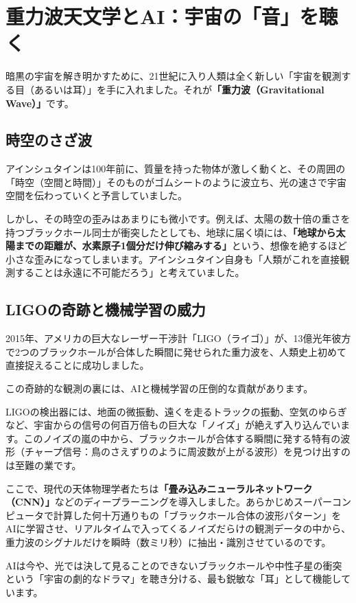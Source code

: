 \section{重力波天文学とAI：宇宙の「音」を聴く}

暗黒の宇宙を解き明かすために、21世紀に入り人類は全く新しい「宇宙を観測する目（あるいは耳）」を手に入れました。それが\textbf{「重力波（Gravitational Wave）」}です。

\subsection{時空のさざ波}

アインシュタインは100年前に、質量を持った物体が激しく動くと、その周囲の「時空（空間と時間）」そのものがゴムシートのように波立ち、光の速さで宇宙空間を伝わっていくと予言していました。

しかし、その時空の歪みはあまりにも微小です。例えば、太陽の数十倍の重さを持つブラックホール同士が衝突したとしても、地球に届く頃には、\textbf{「地球から太陽までの距離が、水素原子1個分だけ伸び縮みする」}という、想像を絶するほど小さな歪みになってしまいます。アインシュタイン自身も「人類がこれを直接観測することは永遠に不可能だろう」と考えていました。

\subsection{LIGOの奇跡と機械学習の威力}

2015年、アメリカの巨大なレーザー干渉計「LIGO（ライゴ）」が、13億光年彼方で2つのブラックホールが合体した瞬間に発せられた重力波を、人類史上初めて直接捉えることに成功しました。

この奇跡的な観測の裏には、AIと機械学習の圧倒的な貢献があります。

LIGOの検出器には、地面の微振動、遠くを走るトラックの振動、空気のゆらぎなど、宇宙からの信号の何百万倍もの巨大な「ノイズ」が絶えず入り込んでいます。このノイズの嵐の中から、ブラックホールが合体する瞬間に発する特有の波形（チャープ信号：鳥のさえずりのように周波数が上がる波形）を見つけ出すのは至難の業です。

ここで、現代の天体物理学者たちは\textbf{「畳み込みニューラルネットワーク（CNN）」}などのディープラーニングを導入しました。あらかじめスーパーコンピュータで計算した何十万通りもの「ブラックホール合体の波形パターン」をAIに学習させ、リアルタイムで入ってくるノイズだらけの観測データの中から、重力波のシグナルだけを瞬時（数ミリ秒）に抽出・識別させているのです。

AIは今や、光では決して見ることのできないブラックホールや中性子星の衝突という「宇宙の劇的なドラマ」を聴き分ける、最も鋭敏な「耳」として機能しています。

